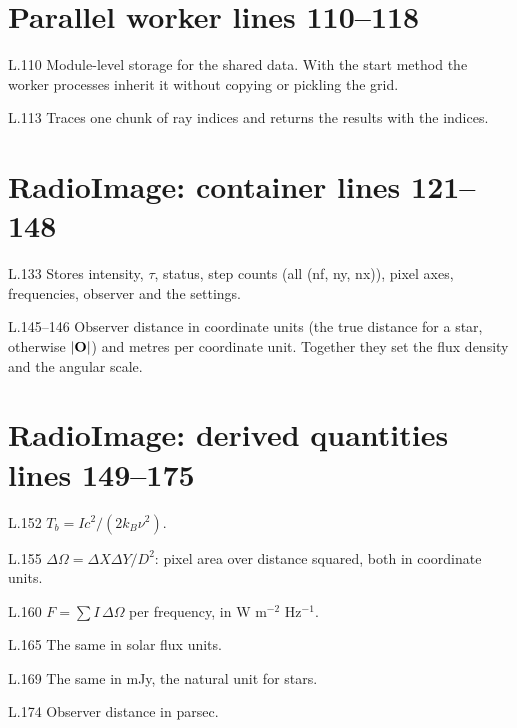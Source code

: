 \section*{\normalsize Parallel worker \hfill{\small\mdseries\color{gray}lines 110--118}}

\begin{lines}
\item[L.110] Module-level storage for the shared data. With the  start method the worker processes inherit it without copying or pickling the grid.
\item[L.113] Traces one chunk of ray indices and returns the results with the indices.
\end{lines}
\section*{\normalsize RadioImage: container \hfill{\small\mdseries\color{gray}lines 121--148}}

\begin{lines}
\item[L.133] Stores intensity, $\tau$, status, step counts (all (nf, ny, nx)), pixel axes, frequencies, observer and the settings.
\item[L.145–146] Observer distance in coordinate units (the true distance for a star, otherwise $|\mathbf{O}|$) and metres per coordinate unit. Together they set the flux density and the angular scale.
\end{lines}
\section*{\normalsize RadioImage: derived quantities \hfill{\small\mdseries\color{gray}lines 149--175}}

\begin{lines}
\item[L.152] $T_b=Ic^2/(2k_B\nu^2)$.
\item[L.155] $\Delta\Omega=\Delta X\Delta Y/D^2$: pixel area over distance squared, both in coordinate units.
\item[L.160] $F=\sum I\,\Delta\Omega$ per frequency, in W m$^{-2}$ Hz$^{-1}$.
\item[L.165] The same in solar flux units.
\item[L.169] The same in mJy, the natural unit for stars.
\item[L.174] Observer distance in parsec.
\end{lines}
